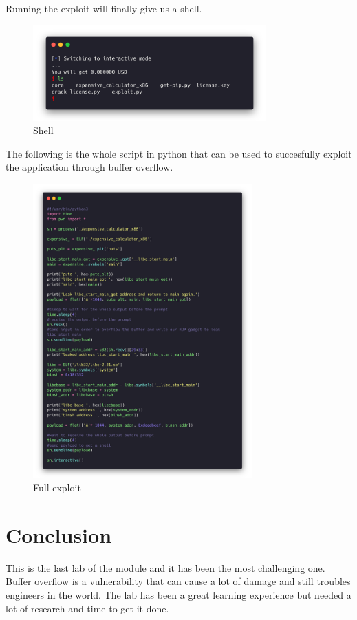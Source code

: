 Running the exploit will finally give us a shell.

\begin{figure}[H]
  \centering
  \includegraphics[width=0.8\textwidth]{figures/end}
  \caption{Shell}
  \label{f:end}
\end{figure}

The following is the whole script in python that can be used to succesfully
exploit the application through buffer overflow.

\begin{figure}[H]
  \centering
  \includegraphics[width=0.75\textwidth]{figures/pwntools-full}
  \caption{Full exploit}
  \label{f:pwntools-full}
\end{figure}

\section{Conclusion}
\label{s:conclusion-lab-6}
This is the last lab of the module and it has been the most challenging one.
Buffer overflow is a vulnerability that can cause a lot of damage and still
troubles engineers in the world. The lab has been a great learning experience
but needed a lot of research and time to get it done.
